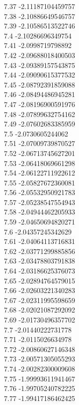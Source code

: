{7.37	-2.11187104459757\\
7.38	-2.10886649546757\\
7.39	-2.10586513522746\\
7.4	-2.10286696349754\\
7.41	-2.0998719798892\\
7.42	-2.09688018400503\\
7.43	-2.09389157543875\\
7.44	-2.09090615377532\\
7.45	-2.08792391859088\\
7.46	-2.08494486945281\\
7.47	-2.08196900591976\\
7.48	-2.07899632754162\\
7.49	-2.07602683385959\\
7.5	-2.0730605244062\\
7.51	-2.07009739870527\\
7.52	-2.06713745627201\\
7.53	-2.06418069661298\\
7.54	-2.06122711922612\\
7.55	-2.05827672360081\\
7.56	-2.05532950921783\\
7.57	-2.05238547554943\\
7.58	-2.04944462205933\\
7.59	-2.04650694820271\\
7.6	-2.04357245342629\\
7.61	-2.04064113716831\\
7.62	-2.03771299885856\\
7.63	-2.03478803791838\\
7.64	-2.03186625376073\\
7.65	-2.02894764579015\\
7.66	-2.02603221340283\\
7.67	-2.02311995598659\\
7.68	-2.02021087292092\\
7.69	-2.01730496357702\\
7.7	-2.01440222731778\\
7.71	-2.0115026634978\\
7.72	-2.00860627146348\\
7.73	-2.00571305055293\\
7.74	-2.00282300009608\\
7.75	-1.99993611941467\\
7.76	-1.99705240782225\\
7.77	-1.99417186462425\\
}
